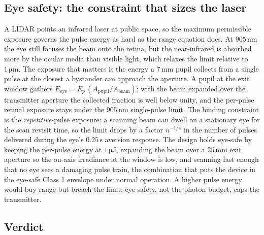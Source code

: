 \subsection{Eye safety: the constraint that sizes the laser}

A LIDAR points an infrared laser at public space, so the maximum permissible
exposure governs the pulse energy as hard as the range equation does. At
$905\,\si{\nano\meter}$ the eye still focuses the beam onto the retina, but the
near-infrared is absorbed more by the ocular media than visible light, which
relaxes the limit relative to $1\,\si{\micro\meter}$. The exposure that matters
is the energy a $7\,\si{\milli\meter}$ pupil collects from a single pulse at
the closest a bystander can approach the aperture. A pupil at the exit window
gathers
$E_{\text{eye}} = E_{p}\,(A_{\text{pupil}}/A_{\text{beam}})$; with the beam
expanded over the transmitter aperture the collected fraction is well below
unity, and the per-pulse retinal exposure stays under the
$905\,\si{\nano\meter}$ single-pulse limit. The binding constraint is the
\emph{repetitive}-pulse exposure: a scanning beam can dwell on a stationary eye
for the scan revisit time, so the limit drops by a factor $n^{-1/4}$ in the
number of pulses delivered during the eye's $0.25\,\si{\second}$ aversion
response. The design holds eye-safe by keeping the per-pulse energy at
$1\,\si{\micro\joule}$, expanding the beam over a $25\,\si{\milli\meter}$ exit
aperture so the on-axis irradiance at the window is low, and scanning fast
enough that no eye sees a damaging pulse train, the combination that puts the
device in the eye-safe Class 1 envelope under normal operation. A higher pulse
energy would buy range but breach the limit; eye safety, not the photon budget,
caps the transmitter.

\subsection{Verdict}

